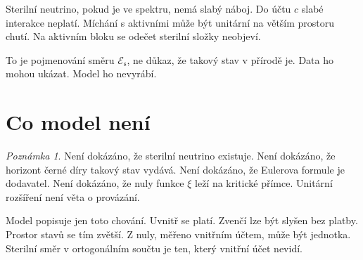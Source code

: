 \documentclass[11pt,a4paper]{article}
\theoremstyle{definition}
\theoremstyle{remark}
\newtheorem{remark}{Poznámka}
\begin{document}
Sterilní neutrino, pokud je ve spektru, nemá slabý náboj.
Do účtu \(c\) slabé interakce neplatí.
Míchání s aktivními může být unitární na větším prostoru chutí.
Na aktivním bloku se odečet sterilní složky neobjeví.

To je pojmenování směru \(\mathcal E_{\mathrm s}\), ne důkaz, že takový stav v přírodě je.
Data ho mohou ukázat.
Model ho nevyrábí.

\section{Co model není}

\begin{remark}
Není dokázáno, že sterilní neutrino existuje.
Není dokázáno, že horizont černé díry takový stav vydává.
Není dokázáno, že Eulerova formule je dodavatel.
Není dokázáno, že nuly funkce \(\xi\) leží na kritické přímce.
Unitární rozšíření není věta o provázání.
\end{remark}

Model popisuje jen toto chování.
Uvnitř se platí.
Zvenčí lze být slyšen bez platby.
Prostor stavů se tím zvětší.
Z nuly, měřeno vnitřním účtem, může být jednotka.
Sterilní směr v ortogonálním součtu je ten, který vnitřní účet nevidí.
\end{document}
